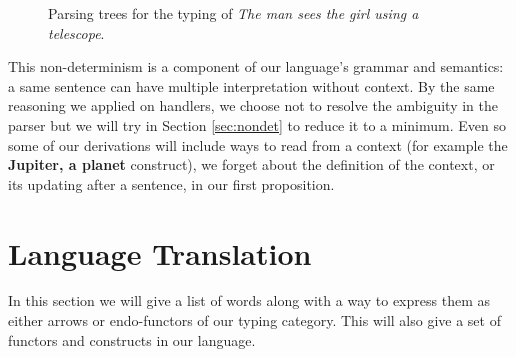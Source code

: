\documentclass[math, english, info]{cours}
\makeatletter
\def\black@or@white#1#2{%
  \@tempdima#2 pt
  \ifdim\@tempdima>0.5 pt
    \definecolor{temp@c}{gray}{0}%
  \else
    \definecolor{temp@c}{gray}{1}%
  \fi}
\def\letterbox#1#{\protect\letterb@x{#1}}
\def\letterb@x#1#2#3{%
  \colorlet{temp@c}[gray]{#2}%
  \extractcolorspec{temp@c}{\color@spec}%
  \expandafter\black@or@white\color@spec
  {\color#1{temp@c}\tallcbox#1{#2}{#3}}}
\def\tallcbox#1#{\protect\color@box{#1}}
\def\color@box#1#2{\color@b@x\relax{\color#1{#2}}}
\def\backbox#1{\letterbox{Lavender!40}{\contour{black}{#1}}}
\def\ty#1{\backbox{\tt\color{yulm!90!black}#1}}
\def\f#1{\backbox{\tt\color{vulm}#1}}
\def\e{\ty{e}}
\def\t{\ty{t}}
\makeatother
\begin{document}
\begin{figure*}
	\centering
	\caption{Parsing trees for the typing of \textsl{The man sees the girl using a telescope}.}
	\label{fig:ud}
\end{figure*}

This non-determinism is a component of our language's grammar and semantics: a same sentence can have multiple interpretation without context.
By the same reasoning we applied on handlers, we choose not to resolve the ambiguity in the parser but we will try in Section \ref{sec:nondet} to reduce it to a minimum.
Even so some of our derivations will include ways to read from a context (for example the \textbf{Jupiter, a planet} construct), we forget about the definition of the context, or its updating after a sentence, in our first proposition.

\section{Language Translation}
\label{sec:language}
In this section we will give a list of words along with a way to express them as either arrows or endo-functors of our typing category.
This will also give a set of functors and constructs in our language.
\end{document}
